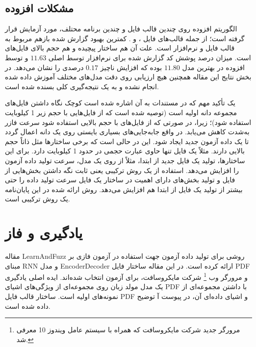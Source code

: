 \subsection{مشکلات افزوده}\label{sec:augmented_afl_problems}

الگوریتم افزوده روی چندین قالب فایل و چندین برنامه محتلف، مورد آزمایش قرار گرفته است؛ از جمله قالب‌های فایل
	 ،  و . کمترین بهبود گزارش شده بازهم مربوط به قالب فایل  و نرم‌افزار  است. علت آن هم ساختار پیچیده و هم حجم بالای فایل‌های  است. 
	 میزان درصد پوشش کد گزارش شده برای نرم‌افزار  توسط  اصلی 
	 $11.63$
	 و توسط افزوده در بهترین مدل $11.80$ بوده که افزایش ناچیز $0.17$ درصدی را نشان می‌دهد. در بخش نتایج این مقاله همچنین هیچ ارزیابی روی دقت مدل‌های مختلف آموزش داده شده انجام نشده و به یک نتیجه‌گیری کلی بسنده شده است.
	 
	 یک تأکید مهم که در مستندات  به آن اشاره شده است کوچک نگاه‌ داشتن فایل‌های مجموعه دانه اولیه است (توصیه شده است که از فایل‌هایی با حجم زیر 1 کیلوبایت استفاده شود)؛ زیرا، در صورتی که از فایل‌های با حجم بالایی استفاده شود سرعت فازر به‌شدت کاهش می‌یابد. در واقع جابه‌جایی‌های بسیاری بایستی روی یک دانه اعمال گردد تا یک داده آزمون جدید ایجاد شود. این در حالی است که برخی ساختارها مثل  ذاتاً حجم بالایی دارند. مثلاً یک فایل  تنها حاوی عبارت 
	 حجمی در حدود 1 کیلوبایت دارد.
	 برای این ساختارها، تولید یک فایل جدید از ابتدا، مثلاً از روی یک مدل، سرعت تولید داده آزمون را افزایش می‌دهد. استفاده از یک روش ترکیبی یعنی ثابت نگه داشتن بخش‌هایی از فایل و تولید بخش‌های دارای اهمیت در ساختار یک فایل سرعت تولید داده را حتی بیشتر از تولید یک فایل از ابتدا هم افزایش می‌دهد. روش ارائه شده در این پایان‌نامه یک روش ترکیبی است.
	 

	 

\section{یادگیری و فاز}
    
مقاله \gls{LearnAndFuzz} \cite{Godefroid:2017:LML:3155562.3155573} روشی برای تولید داده آزمون جهت استفاده در آزمون فازی بر مبنای  \gls{RNN} و مدل \gls{EncoderDecoder} \cite{DBLP:journals/corr/ChoMGBSB14,NIPS2014_5346} ارائه کرده است. در این مقاله ساختار فایل  \gls{PDF} و مرورگر وب
 \footnote{مرورگر جدید شرکت مایکروسافت که همراه با سیستم عامل ویندوز 10 معرفی شد.}
  شرکت مایکروسافت، برای آزمون انتخاب شده‌اند. ایده اصلی یادگیری یک مدل مولد زبان روی مجموعه‌ای از ویژگی‌های اشیای \gls{PDF} با داشتن مجموعه‌ای از نمونه‌های اولیه است. ساختار قالب فایل \gls{PDF} و اشیای داده‌ای آن، در پیوست آ توضیح داده شده است.

